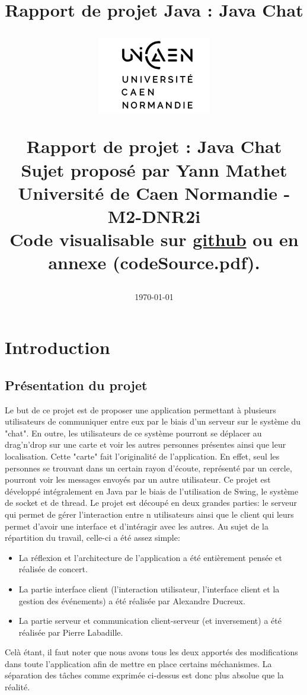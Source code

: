 \documentclass[a4paper,12pt]{report}
\title{Rapport de projet Java : Java Chat}
\title{%
  \begin{figure}[!ht]%
    \centering
    \includegraphics[width=5cm]{unicaen.jpg}%
  \end{figure}%
  Rapport de projet : Java Chat \\
  \large Sujet proposé par Yann Mathet \\
  \large Université de Caen Normandie - M2-DNR2i \\
    Code visualisable sur \href{https://github.com/alimux/JavaChat}{github} ou en annexe (codeSource.pdf).
}
\author{\authorName}
\date{\today}
\begin{document}
  \maketitle
  \tableofcontents

  \chapter{Introduction}

    \section{Présentation du projet}
    Le but de ce projet est de proposer une application permettant à plusieurs utilisateurs de communiquer entre eux par le biais d'un serveur sur le système du "chat". En outre, les utilisateurs de ce système pourront se déplacer au drag'n'drop sur une carte et voir les autres personnes présentes ainsi que leur localisation. Cette "carte" fait l'originalité de l'application. En effet, seul les personnes se trouvant dans un certain rayon d'écoute, représenté par un cercle, pourront voir les messages envoyés par un autre utilisateur. 
    \medbreak
    Ce projet est développé intégralement en Java par le biais de l'utilisation de Swing, le système de socket et de thread. Le projet est découpé en deux grandes parties: le serveur qui permet de gérer l'interaction entre n utilisateurs ainsi que le client qui leurs permet d'avoir une interface et d'intéragir avec les autres.
    \bigbreak
    Au sujet de la répartition du travail, celle-ci a été assez simple:
    \begin{itemize}
      \item La réflexion et l'architecture de l'application a été entièrement pensée et réalisée de concert.
      \item La partie interface client (l'interaction utilisateur, l'interface client et la gestion des événements) a été réalisée par Alexandre Ducreux.
      \item La partie serveur et communication client-serveur (et inversement) a été réalisée par Pierre Labadille.
    \end{itemize}
    \medbreak
    Celà étant, il faut noter que nous avons tous les deux apportés des modifications dans toute l'application afin de mettre en place certains méchanismes. La séparation des tâches comme exprimée ci-dessus est donc plus absolue que la réalité. 
\end{document}
